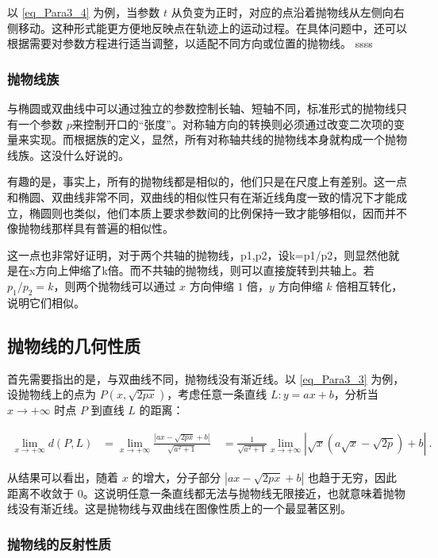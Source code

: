以 \autoref{eq_Para3_4} 为例，当参数 $t$ 从负变为正时，对应的点沿着抛物线从左侧向右侧移动。这种形式能更方便地反映点在轨迹上的运动过程。在具体问题中，还可以根据需要对参数方程进行适当调整，以适配不同方向或位置的抛物线。
ssss

\subsubsection{抛物线族}

与椭圆或双曲线中可以通过独立的参数控制长轴、短轴不同，标准形式的抛物线只有一个参数 $p$来控制开口的“张度”。对称轴方向的转换则必须通过改变二次项的变量来实现。而根据族的定义，显然，所有对称轴共线的抛物线本身就构成一个抛物线族。这没什么好说的。

有趣的是，事实上，所有的抛物线都是相似的，他们只是在尺度上有差别。这一点和椭圆、双曲线非常不同，双曲线的相似性只有在渐近线角度一致的情况下才能成立，椭圆则也类似，他们本质上要求参数间的比例保持一致才能够相似，因而并不像抛物线那样具有普遍的相似性。

这一点也非常好证明，对于两个共轴的抛物线，p1,p2，设k=p1/p2，则显然他就是在x方向上伸缩了k倍。而不共轴的抛物线，则可以直接旋转到共轴上。若 $p_1/p_2 = k$，则两个抛物线可以通过 $x$ 方向伸缩 $1$ 倍，$y$ 方向伸缩 $k$ 倍相互转化，说明它们相似。

\subsection{抛物线的几何性质}

首先需要指出的是，与双曲线不同，抛物线没有渐近线。以 \autoref{eq_Para3_3} 为例，设抛物线上的点为 $P(x, \sqrt{2px})$，考虑任意一条直线 $L: y = ax + b$，分析当 $x \to +\infty$ 时点 $P$ 到直线 $L$ 的距离：

\begin{equation}
\begin{split}
\lim_{x \to +\infty} d(P, L)
&= \lim_{x \to +\infty} \frac{|ax - \sqrt{2px} + b|}{\sqrt{a^2 + 1}}\
&= \frac{1}{\sqrt{a^2 + 1}} \lim_{x \to +\infty} | \sqrt{x} \left( a\sqrt{x} - \sqrt{2p} \right) + b |~.
\end{split}
\end{equation}

从结果可以看出，随着 $x$ 的增大，分子部分 $|ax - \sqrt{2px} + b|$ 也趋于无穷，因此距离不收敛于 $0$。这说明任意一条直线都无法与抛物线无限接近，也就意味着抛物线没有渐近线。这是抛物线与双曲线在图像性质上的一个最显著区别。


\subsubsection{抛物线的反射性质}

